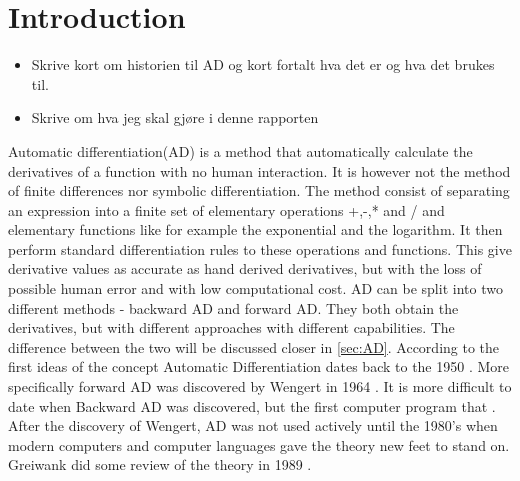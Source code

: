 \chapter{Introduction}
\begin{itemize}
    \item Skrive kort om historien til AD og kort fortalt hva det er og hva det brukes til.
    \item Skrive om hva jeg skal gjøre i denne rapporten
\end{itemize}
Automatic differentiation(AD) is a method that automatically calculate the derivatives of a function with no human interaction. It is however not the method of finite differences nor symbolic differentiation. The method consist of separating an expression into a finite set of elementary operations +,-,* and / and elementary functions like for example the exponential and the logarithm. It then perform standard differentiation rules to these operations and functions. This give derivative values as accurate as hand derived derivatives, but with the loss of possible human error and with low computational cost. AD can be split into two different methods - backward AD and forward AD. They both obtain the derivatives, but with different approaches with different capabilities. The difference between the two will be discussed closer in \autoref{sec:AD}. According to \emph{\citep{SurveyAD}} the first ideas of the concept Automatic Differentiation dates back to the 1950 \emph{\citep{beda1959programs}}. More specifically forward AD was discovered by Wengert in 1964 \emph{\citep{wengert1964simple}}. It is more difficult to date when Backward AD was discovered, but the first computer program that . After the discovery of Wengert, AD was not used actively until the 1980's when modern computers and computer languages gave the theory new feet to stand on. Greiwank did some review of the theory in 1989 \emph{\citep{griewank1989automatic}}.
\listoftodos